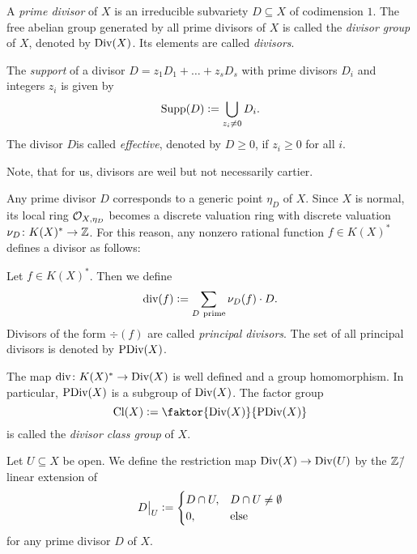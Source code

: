 \begin{defi}[Divisor]
	A \emph{prime divisor} of $X$ is an irreducible subvariety $D\subseteq X$ of codimension $1$. The free abelian group generated by all prime divisors of $X$ is called the \emph{divisor group} of $X$, denoted by $\text{Div}(X)$. Its elements are called \emph{divisors}.
	
	The \emph{support} of a divisor $D = z_1 D_1 + \dots + z_s D_s$ with prime divisors $D_i$ and integers $z_i$ is given by
	$$\text{Supp}(D) \mathrel{\mathop:}= \bigcup_{z_i \neq 0} D_i.$$
	The divisor $D$is called \emph{effective}, denoted by $D \geq 0$, if $z_i \geq 0 $ for all $i$.
\end{defi}

Note, that for us, divisors are weil but not necessarily cartier.

Any prime divisor $D$ corresponds to a generic point $\eta_D$ of $X$. Since $X$ is normal, its local ring $\mathcal{O}_{X,\eta_D}$ becomes a discrete valuation ring with discrete valuation $\nu_D\colon K(X)^* \rightarrow \mathbb{Z}$. For this reason, any nonzero rational function $f\in K(X)^*$ defines a divisor as follows:

\begin{defi}
	Let $f\in K(X)^*$. Then we define
	$$\div(f) \defeq \sum_{D\ \text{prime}} \nu_D(f) \cdot D.$$
	Divisors of the form $\div(f)$ are called \emph{principal divisors}. The set of all principal divisors is denoted by $\text{PDiv}(X)$.
\end{defi}

\begin{remark}
	The map $\text{div}\colon K(X)^* \rightarrow \text{Div}(X)$ is well defined and a group homomorphism. In particular, $\text{PDiv}(X)$ is a subgroup of $\text{Div}(X)$. The factor group
	$$\Cl(X) \defeq \faktor{\Div(X)}{\PDiv(X)}$$
	is called the \emph{divisor class group} of $X$.
\end{remark}

\begin{defi}
	\label{defi:divisor_restriction}
	Let $U\subseteq X$ be open. We define the restriction map $\text{Div}(X) \rightarrow \text{Div}(U)$ by the $\mathbb{Z}$\=/linear extension of 
	$$D{\big |_{U}} \mathrel{\mathop:}= \begin{cases}
	D\cap U, & D\cap U \neq \emptyset \\
	0,	& \text{else}
	\end{cases}$$
	for any prime divisor $D$ of $X$.
\end{defi}


